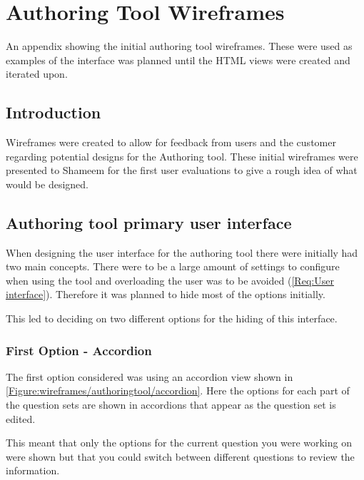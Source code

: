\chapter{Authoring Tool Wireframes} \label{App:Authoring Tool Wireframes}

\begin{preamble}
	An appendix showing the initial authoring tool wireframes. These were used as examples of the interface was planned until the HTML views were created and iterated upon.
\end{preamble}

\section{Introduction}

Wireframes were created to allow for feedback from users and the customer regarding potential designs for the Authoring tool. These initial wireframes were presented to Shameem for the first user evaluations to give a rough idea of what would be designed.

\section{Authoring tool primary user interface}

When designing the user interface for the authoring tool there were initially had two main concepts. There were to be a large amount of settings to configure when using the tool and overloading the user was to be avoided (\cref{Req:User interface}). Therefore it was planned to hide most of the options initially.

This led to deciding on two different options for the hiding of this interface.

\subsection{First Option - Accordion} 

The first option considered was using an accordion view shown in \autoref{Figure:wireframes/authoringtool/accordion}. Here the options for each part of the question sets are shown in accordions that appear as the question set is edited.

This meant that only the options for the current question you were working on were shown but that you could switch between different questions to review the information.

